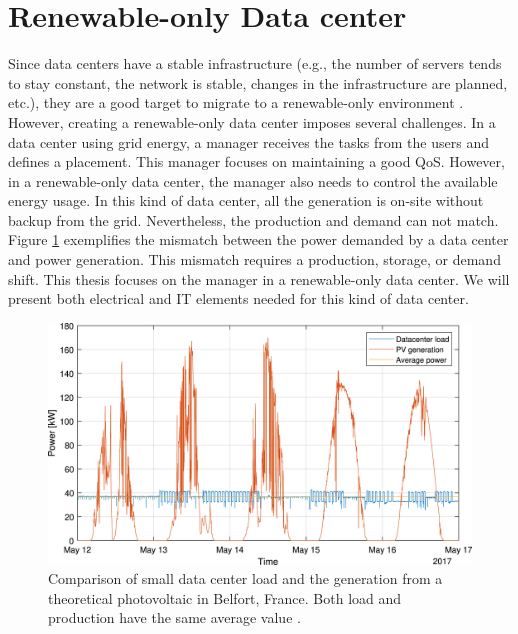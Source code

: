 \section{Renewable-only Data center}
Since data centers have a stable infrastructure (e.g., the number of servers tends to stay constant, the network is stable, changes in the infrastructure are planned, etc.), they are a good target to migrate to a renewable-only environment \cite{rostirolla2022survey}. However, creating a renewable-only data center imposes several challenges. In a data center using grid energy, a manager receives the tasks from the users and defines a placement. This manager focuses on maintaining a good QoS. However, in a renewable-only data center, the manager also needs to control the available energy usage. In this kind of data center, all the generation is on-site without backup from the grid. Nevertheless, the production and demand can not match. Figure \ref{fig:load_production} exemplifies the mismatch between the power demanded by a data center and power generation. This mismatch requires a production, storage, or demand shift. This thesis focuses on the manager in a renewable-only data center. We will present both electrical and IT elements needed for this kind of data center.

\begin{figure}[!htb]
    \centering
    \includegraphics[scale=1]{Images/Related_works/load_production.jpg}
    \caption[Comparison of small data center load and the generation from a theoretical photovoltaic in Belfort, France. Both load and production have the same average value.]{Comparison of small data center load and the generation from a theoretical photovoltaic in Belfort, France. Both load and production have the same average value \cite{rostirolla2022survey}.}
    \label{fig:load_production}
\end{figure}

